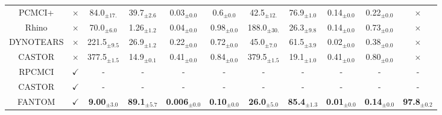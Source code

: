\begin{table}[H]
{\begin{tabular}{@{}cccccccccc|c@{}}
PCMCI+ & \multicolumn{1}{c|}{$\times$}   & 84.0$_{\pm17.}$ & 39.7$_{\pm2.6}$ & 0.03$_{\pm0.0}$ & 0.6$_{\pm0.0}$ & 42.5$_{\pm12.}$ & 76.9$_{\pm1.0}$ & 0.14$_{\pm0.0}$ & 0.22$_{\pm0.0}$ & $\times$ \\
    Rhino & \multicolumn{1}{c|}{$\times$}  & 70.0$_{\pm6.0}$ & 1.26$_{\pm1.2}$ & 0.04$_{\pm0.0}$ & 0.98$_{\pm0.0}$ & 188.0$_{\pm30.}$ & 26.3$_{\pm9.8}$ & 0.14$_{\pm0.0}$ & 0.73$_{\pm0.0}$ & $\times$ \\
    DYNOTEARS & \multicolumn{1}{c|}{$\times$} & 221.5$_{\pm9.5}$ & 26.9$_{\pm1.2}$ & 0.22$_{\pm0.0}$ & 0.72$_{\pm0.0}$ & 45.0$_{\pm7.0}$ & 61.5$_{\pm3.9}$ & 0.02$_{\pm0.0}$ & 0.38$_{\pm0.0}$ & $\times$  \\
    CASTOR & \multicolumn{1}{c|}{$\times$} &  377.5$_{\pm1.5}$ & 14.9$_{\pm0.1}$ & 0.41$_{\pm0.0}$ & 0.84$_{\pm0.0}$ & 379.5$_{\pm1.5}$ & 19.1$_{\pm1.0}$ & 0.41$_{\pm0.0}$ & 0.80$_{\pm0.0}$ & $\times$  \\
    \midrule
    RPCMCI & \multicolumn{1}{c|}{$\checkmark$} &  - & - & - & - & - & - & - & - & -  \\
    CASTOR & \multicolumn{1}{c|}{$\checkmark$} &  - & - & - & - & - & - & - & - & -  \\
\rowcolor{gray!20} FANTOM                 & \multicolumn{1}{c|}{$\checkmark$}           & \textbf{9.00}$_{\pm3.0}$ & \textbf{89.1}$_{\pm5.7}$                                   & \textbf{0.006}$_{\pm0.0}$                                                 & \textbf{0.10}$_{\pm0.0}$                                                   & \textbf{26.0}$_{\pm5.0}$ & \textbf{85.4}$_{\pm1.3}$                                   & \textbf{0.01}$_{\pm0.0}$                                                 & \multicolumn{1}{c|}{\textbf{0.14}$_{\pm0.0}$}                                                   & \textbf{97.8}$_{\pm0.2}$ \\ \bottomrule
\end{tabular}}
\end{table}

